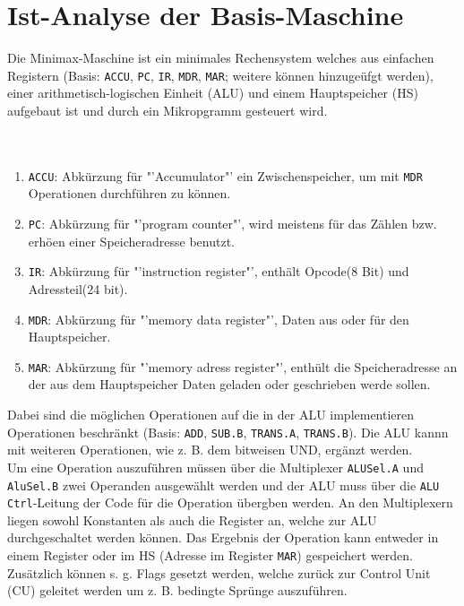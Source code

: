 \documentclass[12pt,titlepage]{article}
\begin{document}
\section{Ist-Analyse der Basis-Maschine}

Die Minimax-Maschine ist ein minimales Rechensystem welches aus einfachen Registern (Basis: \texttt{ACCU}, \texttt{PC}, \texttt{IR}, \texttt{MDR}, \texttt{MAR};
weitere k{\"o}nnen hinzuge{\"u}fgt werden), einer arithmetisch-logischen Einheit (ALU) und einem Hauptspeicher (HS) aufgebaut
ist und durch ein Mikropgramm gesteuert wird.\\
\\
\\
\begin{enumerate}
\item \texttt{ACCU}: Abk{\"u}rzung f{\"u}r "'Accumulator"' ein Zwischenspeicher, um mit \texttt{MDR} Operationen durchführen zu k{\"o}nnen.
\item \texttt{PC}: Abk{\"u}rzung f{\"u}r "'program counter"', wird meistens f{\"u}r das Z{\"a}hlen bzw. erh{\"o}en einer Speicheradresse benutzt.
\item \texttt{IR}: Abk{\"u}rzung f{\"u}r "'instruction register"', enthält Opcode(8 Bit) und Adressteil(24 bit).
\item \texttt{MDR}: Abk{\"u}rzung f{\"u}r "'memory data register"', Daten aus oder f{\"u}r den Hauptspeicher.
\item \texttt{MAR}: Abk{\"u}rzung f{\"u}r "'memory adress register"', enth{\"u}lt die Speicheradresse an der aus dem Hauptspeicher Daten geladen oder geschrieben werde sollen.
\end{enumerate}
Dabei sind die m{\"o}glichen Operationen auf die in der ALU implementieren
Operationen beschr{\"a}nkt (Basis: \texttt{ADD}, \texttt{SUB.B}, \texttt{TRANS.A}, \texttt{TRANS.B}). Die ALU kannn mit weiteren Operationen,
wie z. B. dem bitweisen UND, erg{\"a}nzt werden.\\
Um eine Operation auszuf{\"u}hren m{\"u}ssen {\"u}ber die Multiplexer \texttt{ALUSel.A} und \texttt{AluSel.B} zwei Operanden ausgew{\"a}hlt werden
und der ALU muss {\"u}ber die \texttt{ALU Ctrl}-Leitung der Code f{\"u}r die Operation {\"u}bergben werden. An den Multiplexern liegen sowohl
Konstanten als auch die Register an, welche zur ALU durchgeschaltet werden k{\"o}nnen. Das Ergebnis der Operation kann
entweder in einem Register oder im HS (Adresse im Register \texttt{MAR}) gespeichert werden. Zus{\"a}tzlich k{\"o}nnen s. g. Flags 
gesetzt werden, welche zur{\"u}ck zur Control Unit (CU) geleitet werden um z. B. bedingte Spr{\"u}nge auszuf{\"u}hren.
\end{document}
